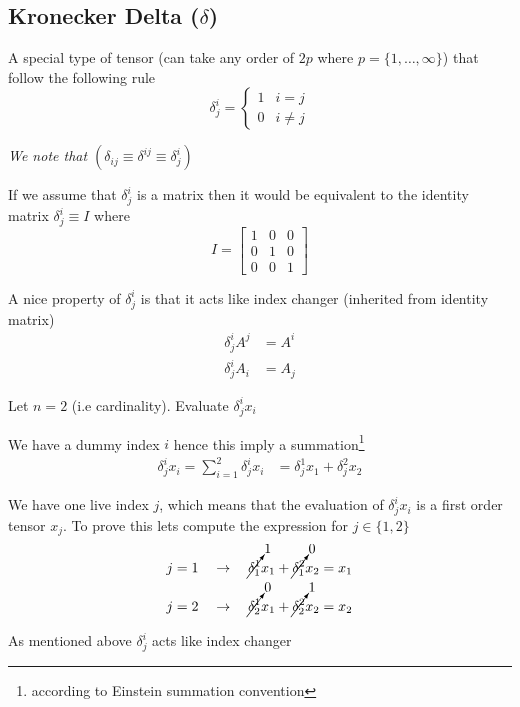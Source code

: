 \documentclass[../main.tex]{subfiles}
\begin{document}
	
	\subsection{Kronecker Delta ($\delta$)}
		\par A special type of tensor (can take any order of $2p$ where $p=\lbrace 1, \hdots, \infty \rbrace$) that follow the following rule
		\begin{equation*}
			\delta_j^i = 
			\begin{cases} 
	      		1 & i=j \\
	      		0 & i \neq j
			\end{cases}
		\end{equation*}
		\begin{flushright}
			\textit{We note that $(\delta_{ij} \equiv \delta^{ij} \equiv \delta_j^i)$}
		\end{flushright}
		
		\par If we assume that $\delta_j^i$ is a matrix then it would be equivalent to the identity matrix $\delta_j^i \equiv I$ where
		\begin{equation*}
			I =
			\begin{bmatrix}
				1 & 0 & 0 \\
				0 & 1 & 0 \\
				0 & 0 & 1
			\end{bmatrix}	
		\end{equation*}
		
		\par A nice property of $\delta_j^i$ is that it acts like index changer (inherited from identity matrix)
		\begin{align*}
			\delta_j^i A^j &= A^i \\
			\delta_j^i A_i &= A_j 
		\end{align*}
	
		\begin{example}
			Let $n=2$ (i.e cardinality). Evaluate $\delta_j^i x_i$ 
		\end{example}
		\begin{solution}
			We have a dummy index $i$ hence this imply a summation\footnote{according to Einstein summation convention}
			\begin{align*}
				\delta_j^i x_i = \sum_{i=1}^2 \delta_j^i x_i 	&= \delta_j^1 x_1 + \delta_j^2 x_2
			\end{align*}
			
			We have one live index $j$, which means that the evaluation of $\delta_j^i x_i$ is a first order tensor $x_j$. To prove this lets compute the expression for $j \in \lbrace 1, 2 \rbrace$
			\begin{align*}
				j = 1 \quad \rightarrow \quad	\cancelto{1}{\delta_1^1} x_1 + \cancelto{0}{\delta_1^2} x_2 = x_1 \\
				j = 2 \quad \rightarrow \quad	\cancelto{0}{\delta_2^1} x_1 + \cancelto{1}{\delta_2^2} x_2 = x_2 \\
			\end{align*}
			
			As mentioned above $\delta_j^i$ acts like index changer 
		\end{solution}
		
\end{document}
